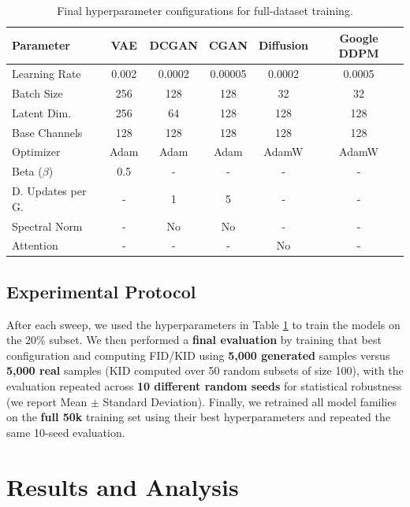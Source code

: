 \documentclass[runningheads]{llncs}
\begin{document}
\begin{table}[h]
\centering
\caption{Final hyperparameter configurations for full-dataset training.}\label{tab:hyperparams}
\begin{tabular}{lccccc}
\toprule
\textbf{Parameter} & \textbf{VAE} & \textbf{DCGAN} & \textbf{CGAN} & \textbf{Diffusion} & \textbf{Google DDPM} \\ \midrule
Learning Rate & 0.002 & 0.0002 & 0.00005 & 0.0002 & 0.0005 \\ 
Batch Size & 256 & 128 & 128 & 32 & 32 \\ 
Latent Dim. & 256 & 64 & 128 & 128 & 128 \\ 
Base Channels & 128 & 128 & 128 & 128 & 128 \\ 
Optimizer & Adam & Adam & Adam & AdamW & AdamW \\ 
Beta ($\beta$) & 0.5 & - & - & - & - \\
D. Updates per G. & - & 1 & 5 & - & - \\
Spectral Norm & - & No & No & - & - \\
Attention & - & - & - & No & - \\
\bottomrule
\end{tabular}
\end{table}

\vspace{-0.2cm}

\subsection{Experimental Protocol}
After each sweep, we used the hyperparameters in Table \ref{tab:hyperparams} to train the models on the 20\% subset. We then performed a \textbf{final evaluation} by training that best configuration and computing FID/KID using \textbf{5,000 generated} samples versus \textbf{5,000 real} samples (KID computed over 50 random subsets of size 100), with the evaluation repeated across \textbf{10 different random seeds} for statistical robustness (we report Mean $\pm$ Standard Deviation). Finally, we retrained all model families on the \textbf{full 50k} training set using their best hyperparameters and repeated the same 10-seed evaluation.

\section{Results and Analysis}
\end{document}
